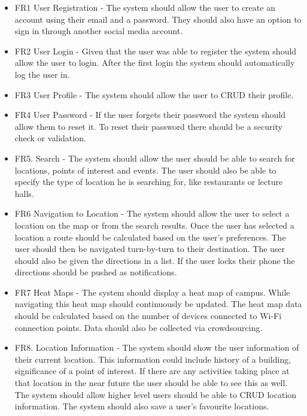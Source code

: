 \documentclass[11pt]{article}
\begin{document}
	\begin{itemize}
		\item FR1 User Registration - The system should allow the user to create an account using their email and a password. They should also have an option to sign in through another social media account.
		
		\item FR2 User Login - Given that the user was able to register the system should allow the user to login. After the first login the system should automatically log the user in.
		
		\item FR3 User Profile - The system should allow the user to CRUD their profile.
		
		\item FR4 User Password - If the user forgets their password the system should allow them to reset it. To reset their password there should be a security check or validation.
		
		\item FR5. Search - The system should allow the user should be able to search for locations, points of interest and events. The user should also be able to specify the type of location he is searching for, like restaurants or lecture halls.
		
		\item FR6 Navigation to Location - The system should allow the user to select a location on the map or from the search results. Once the user has selected a location a route should be calculated based on the user's preferences. The user should then be navigated turn-by-turn to their destination. The user should also be given the directions in a list. If the user locks their phone the directions should be pushed as notifications.
		
		\item FR7 Heat Maps - The system should display a heat map of campus. While navigating this heat map should continuously be updated. The heat map data should be calculated based on the number of devices connected to Wi-Fi connection points. Data should also be collected via crowdsourcing. 
		
		\item FR8. Location Information - The system should show the user information of their current location. This information could include history of a building, significance of a point of interest. If there are any activities taking place at that location in the near future the user should be able to see this as well. The system should allow higher level users should be able to CRUD location information. The system should also save a user's favourite locations.
		

\end{itemize}
\end{document}
